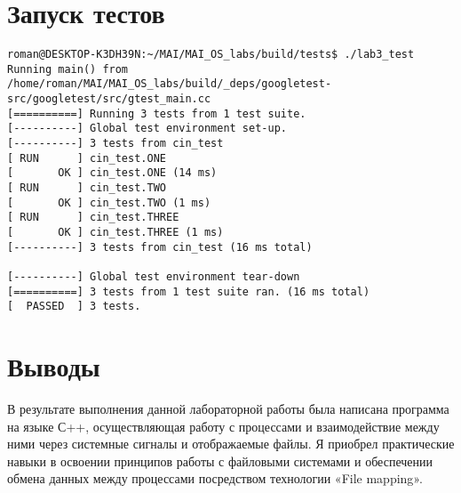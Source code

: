 \documentclass[a4paper, 12pt]{article}
\begin{document}
\newpage
\section{Запуск тестов}
\begin{verbatim}
roman@DESKTOP-K3DH39N:~/MAI/MAI_OS_labs/build/tests$ ./lab3_test 
Running main() from /home/roman/MAI/MAI_OS_labs/build/_deps/googletest-src/googletest/src/gtest_main.cc
[==========] Running 3 tests from 1 test suite.
[----------] Global test environment set-up.
[----------] 3 tests from cin_test
[ RUN      ] cin_test.ONE
[       OK ] cin_test.ONE (14 ms)
[ RUN      ] cin_test.TWO
[       OK ] cin_test.TWO (1 ms)
[ RUN      ] cin_test.THREE
[       OK ] cin_test.THREE (1 ms)
[----------] 3 tests from cin_test (16 ms total)

[----------] Global test environment tear-down
[==========] 3 tests from 1 test suite ran. (16 ms total)
[  PASSED  ] 3 tests.
\end{verbatim}

\newpage
\section{Выводы}
В результате выполнения данной лабораторной работы была написана программа на языке С++, осуществляющая работу с процессами и взаимодействие между ними через системные сигналы и отображаемые файлы. Я приобрел практические навыки в освоении принципов работы с файловыми системами и обеспечении обмена данных между процессами посредством технологии «File mapping».
\end{document}
